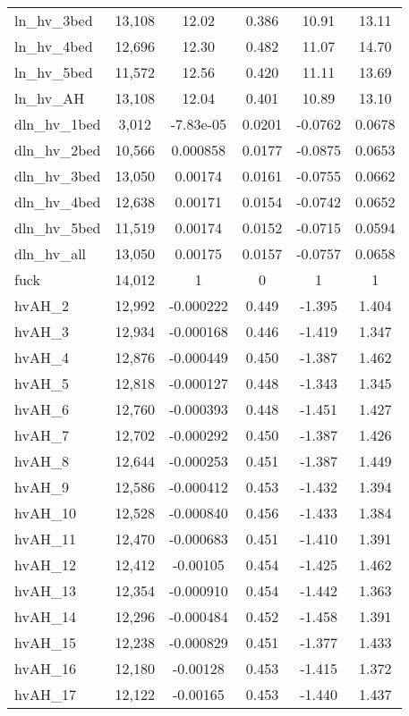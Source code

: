 \begin{tabular}{lccccc}
ln\_hv\_3bed & 13,108 & 12.02 & 0.386 & 10.91 & 13.11 \\
ln\_hv\_4bed & 12,696 & 12.30 & 0.482 & 11.07 & 14.70 \\
ln\_hv\_5bed & 11,572 & 12.56 & 0.420 & 11.11 & 13.69 \\
ln\_hv\_AH & 13,108 & 12.04 & 0.401 & 10.89 & 13.10 \\
dln\_hv\_1bed & 3,012 & -7.83e-05 & 0.0201 & -0.0762 & 0.0678 \\
dln\_hv\_2bed & 10,566 & 0.000858 & 0.0177 & -0.0875 & 0.0653 \\
dln\_hv\_3bed & 13,050 & 0.00174 & 0.0161 & -0.0755 & 0.0662 \\
dln\_hv\_4bed & 12,638 & 0.00171 & 0.0154 & -0.0742 & 0.0652 \\
dln\_hv\_5bed & 11,519 & 0.00174 & 0.0152 & -0.0715 & 0.0594 \\
dln\_hv\_all & 13,050 & 0.00175 & 0.0157 & -0.0757 & 0.0658 \\
fuck & 14,012 & 1 & 0 & 1 & 1 \\
hvAH\_2 & 12,992 & -0.000222 & 0.449 & -1.395 & 1.404 \\
hvAH\_3 & 12,934 & -0.000168 & 0.446 & -1.419 & 1.347 \\
hvAH\_4 & 12,876 & -0.000449 & 0.450 & -1.387 & 1.462 \\
hvAH\_5 & 12,818 & -0.000127 & 0.448 & -1.343 & 1.345 \\
hvAH\_6 & 12,760 & -0.000393 & 0.448 & -1.451 & 1.427 \\
hvAH\_7 & 12,702 & -0.000292 & 0.450 & -1.387 & 1.426 \\
hvAH\_8 & 12,644 & -0.000253 & 0.451 & -1.387 & 1.449 \\
hvAH\_9 & 12,586 & -0.000412 & 0.453 & -1.432 & 1.394 \\
hvAH\_10 & 12,528 & -0.000840 & 0.456 & -1.433 & 1.384 \\
hvAH\_11 & 12,470 & -0.000683 & 0.451 & -1.410 & 1.391 \\
hvAH\_12 & 12,412 & -0.00105 & 0.454 & -1.425 & 1.462 \\
hvAH\_13 & 12,354 & -0.000910 & 0.454 & -1.442 & 1.363 \\
hvAH\_14 & 12,296 & -0.000484 & 0.452 & -1.458 & 1.391 \\
hvAH\_15 & 12,238 & -0.000829 & 0.451 & -1.377 & 1.433 \\
hvAH\_16 & 12,180 & -0.00128 & 0.453 & -1.415 & 1.372 \\
hvAH\_17 & 12,122 & -0.00165 & 0.453 & -1.440 & 1.437 \\

\end{tabular}
